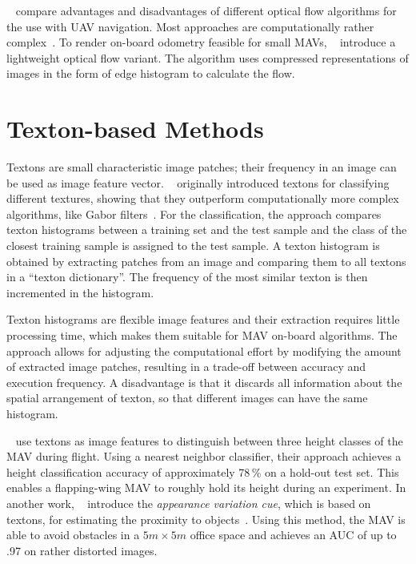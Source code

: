 \documentclass[11pt]{report}
\begin{document}
\citeauthor{chao2013survey}~\cite{chao2013survey} compare advantages
and disadvantages of different optical flow algorithms for the use
with UAV navigation. Most approaches are computationally rather
complex~\cite{mcguire2016local}. To render on-board odometry feasible
for small MAVs, \citeauthor{mcguire2016local}~\cite{mcguire2016local}
introduce a lightweight optical flow variant. The algorithm uses
compressed representations of images in the form of edge histogram to
calculate the flow.

\section{Texton-based Methods}
\label{sec:textonbasedapproaches}

Textons are small characteristic image patches; their frequency in an
image can be used as image feature
vector. \citeauthor{varma2005statistical}~\cite{varma2005statistical}
originally introduced textons for classifying different textures,
showing that they outperform computationally more complex algorithms,
like Gabor filters~\cite{varma2005statistical}. For the
classification, the approach compares texton histograms between a
training set and the test sample and the class of the closest training
sample is assigned to the test
sample. %
A texton histogram is obtained by extracting patches from an image and
comparing them to all textons in a ``texton dictionary''. The
frequency of the most similar texton is then incremented in the
histogram.

Texton histograms are flexible image features and their extraction
requires little processing time, which makes them suitable for MAV
on-board algorithms. The approach allows for adjusting the
computational effort by modifying the amount of extracted image
patches, resulting in a trade-off between accuracy and execution
frequency.  A disadvantage is that it discards all information about the spatial
arrangement of texton, %
so that different images can have the same histogram.

\citeauthor{de2009design}~\cite{de2009design} use textons
as image features to distinguish between three height classes of the
MAV during flight. Using a nearest neighbor classifier, their approach
achieves a height classification accuracy of approximately 78\,\% on a
hold-out test set. This enables a flapping-wing MAV to roughly hold
its height during an experiment. In another work,
\citeauthor{de2012appearance}~\cite{de2012appearance} introduce the
\emph{appearance variation cue}, which is based on textons, for
estimating the proximity to objects~\cite{de2012appearance}.
Using this method, the MAV is able to avoid obstacles in a
$5m \times 5m$ office space and achieves an AUC of up to .97 on rather
distorted images.
\end{document}
